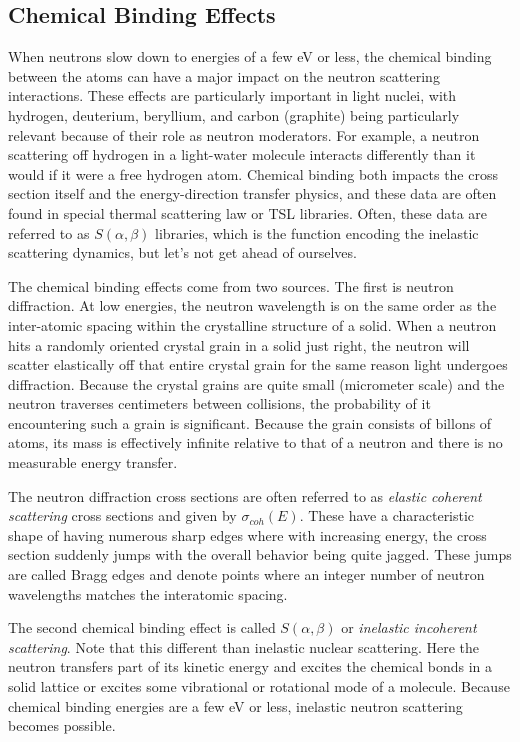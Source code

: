 \subsection{Chemical Binding Effects}

When neutrons slow down to energies of a few eV or less, the chemical binding between the atoms can have a major impact on the neutron scattering interactions. These effects are particularly important in light nuclei, with hydrogen, deuterium, beryllium, and carbon (graphite) being particularly relevant because of their role as neutron moderators. For example, a neutron scattering off hydrogen in a light-water molecule interacts differently than it would if it were a free hydrogen atom. Chemical binding both impacts the cross section itself and the energy-direction transfer physics, and these data are often found in special thermal scattering law or TSL libraries. Often, these data are referred to as $S(\alpha,\beta)$ libraries, which is the function encoding the inelastic scattering dynamics, but let's not get ahead of ourselves.

The chemical binding effects come from two sources. The first is neutron diffraction. At low energies, the neutron wavelength is on the same order as the inter-atomic spacing within the crystalline structure of a solid. When a neutron hits a randomly oriented crystal grain in a solid just right, the neutron will scatter elastically off that entire crystal grain for the same reason light undergoes diffraction. Because the crystal grains are quite small (micrometer scale) and the neutron traverses centimeters between collisions, the probability of it encountering such a grain is significant. Because the grain consists of billons of atoms, its mass is effectively infinite relative to that of a neutron and there is no measurable energy transfer.

The neutron diffraction cross sections are often referred to as \emph{elastic coherent scattering} cross sections and given by $\sigma_{coh}(E)$. These have a characteristic shape of having numerous sharp edges where with increasing energy, the cross section suddenly jumps with the overall behavior being quite jagged. These jumps are called Bragg edges and denote points where an integer number of neutron wavelengths matches the interatomic spacing.

The second chemical binding effect is called $S(\alpha,\beta)$ or \emph{inelastic incoherent scattering}. Note that this different than inelastic nuclear scattering. Here the neutron transfers part of its kinetic energy and excites the chemical bonds in a solid lattice or excites some vibrational or rotational mode of a molecule. Because chemical binding energies are a few eV or less, inelastic neutron scattering becomes possible.

